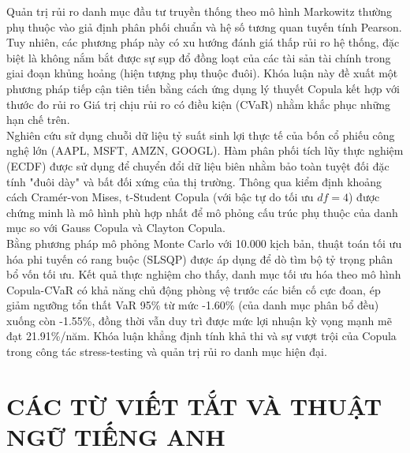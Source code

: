 \documentclass[a4paper,12pt]{article}
\begin{document}
Quản trị rủi ro danh mục đầu tư truyền thống theo mô hình Markowitz thường phụ thuộc vào giả định phân phối chuẩn và hệ số tương quan tuyến tính Pearson. Tuy nhiên, các phương pháp này có xu hướng đánh giá thấp rủi ro hệ thống, đặc biệt là không nắm bắt được sự sụp đổ đồng loạt của các tài sản tài chính trong giai đoạn khủng hoảng (hiện tượng phụ thuộc đuôi). Khóa luận này đề xuất một phương pháp tiếp cận tiên tiến bằng cách ứng dụng lý thuyết Copula kết hợp với thước đo rủi ro Giá trị chịu rủi ro có điều kiện (CVaR) nhằm khắc phục những hạn chế trên.\\
Nghiên cứu sử dụng chuỗi dữ liệu tỷ suất sinh lợi thực tế của bốn cổ phiếu công nghệ lớn (AAPL, MSFT, AMZN, GOOGL). Hàm phân phối tích lũy thực nghiệm (ECDF) được sử dụng để chuyển đổi dữ liệu biên nhằm bảo toàn tuyệt đối đặc tính "đuôi dày" và bất đối xứng của thị trường. Thông qua kiểm định khoảng cách Cramér-von Mises, t-Student Copula (với bậc tự do tối ưu $df=4$) được chứng minh là mô hình phù hợp nhất để mô phỏng cấu trúc phụ thuộc của danh mục so với Gauss Copula và Clayton Copula. \\
Bằng phương pháp mô phỏng Monte Carlo với 10.000 kịch bản, thuật toán tối ưu hóa phi tuyến có rang buộc (SLSQP) được áp dụng để dò tìm bộ tỷ trọng phân bổ vốn tối ưu. Kết quả thực nghiệm cho thấy, danh mục tối ưu hóa theo mô hình Copula-CVaR có khả năng chủ động phòng vệ trước các biến cố cực đoan, ép giảm ngưỡng tổn thất VaR 95\% từ mức -1.60\% (của danh mục phân bổ đều) xuống còn -1.55\%, đồng thời vẫn duy trì được mức lợi nhuận kỳ vọng mạnh mẽ đạt 21.91\%/năm. Khóa luận khẳng định tính khả thi và sự vượt trội của Copula trong công tác stress-testing và quản trị rủi ro danh mục hiện đại.

\newpage
\tableofcontents  %
\newpage
\listoffigures %

\listoftables %
\newpage

\section*{CÁC TỪ VIẾT TẮT VÀ THUẬT NGỮ TIẾNG ANH}
\end{document}
